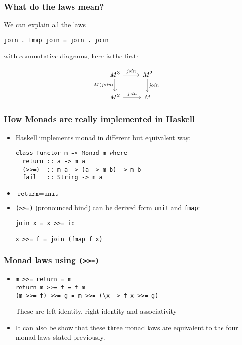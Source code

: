 \documentclass{beamer} %
\begin{document}
\begin{frame}[fragile]\frametitle{What do the laws mean?}
We can explain all the laws
\begin{verbatim}
join . fmap join = join . join
\end{verbatim}
with commutative diagrams, here is the first:

\[ 
\begin{tikzcd}
M^3 \arrow{r}{\mathit{join}} \arrow[swap]{d}{M(\mathit{join})} & M^2 \arrow{d}{\mathit{join}} \\
M^2 \arrow{r}{\mathit{join}} & M
\end{tikzcd}
\]
\end{frame}

\begin{frame}[fragile]\frametitle{How Monads are really implemented in Haskell}
\begin{itemize}
  \item Haskell implements monad in different but equivalent way:

\begin{verbatim}
class Functor m => Monad m where
  return :: a -> m a
  (>>=)  :: m a -> (a -> m b) -> m b
  fail   :: String -> m a
\end{verbatim}
\item $\texttt{return} = \texttt{unit}$

\item \texttt{(>>=)} (pronounced bind) can be derived form \texttt{unit} and \texttt{fmap}:

\begin{verbatim}
join x = x >>= id

x >>= f = join (fmap f x)
\end{verbatim}
\end{itemize}
\end{frame}

\begin{frame}[fragile]\frametitle{Monad laws using \texttt{(>>=)}}
  \begin{itemize}
    \item 
\begin{verbatim}
m >>= return = m
return m >>= f = f m
(m >>= f) >>= g = m >>= (\x -> f x >>= g)
\end{verbatim}
These are left identity, right identity and associativity
  \item It can also be show that these three monad laws are equivalent to the four monad laws
    stated previously.
\end{itemize}
\end{frame}
\end{document}
